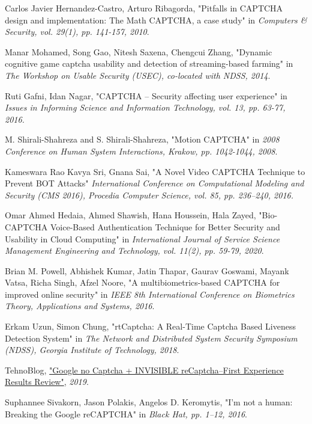 \begin{thebibliography}{9}
Carlos Javier Hernandez-Castro, Arturo Ribagorda, "Pitfalls in CAPTCHA design and implementation: The Math CAPTCHA, a case study" in \emph{Computers \& Security, vol. 29(1), pp. 141-157, 2010}.

Manar Mohamed, Song Gao, Nitesh Saxena, Chengcui Zhang,  "Dynamic cognitive  game  captcha  usability  and  detection  of  streaming-based  farming" in \emph{The Workshop on Usable Security (USEC), co-located with NDSS, 2014}.

Ruti Gafni, Idan Nagar, "CAPTCHA – Security affecting user experience" in \emph{Issues in Informing Science and Information Technology, vol. 13, pp. 63-77, 2016.}

M. Shirali-Shahreza and S. Shirali-Shahreza, "Motion CAPTCHA" in \emph{2008 Conference on Human System Interactions, Krakow, pp. 1042-1044, 2008}.

Kameswara Rao Kavya Sri, Gnana Sai, "A Novel Video CAPTCHA Technique to Prevent BOT Attacks" \emph{International Conference on Computational Modeling and  Security (CMS 2016), Procedia Computer  Science, vol. 85, pp. 236–240, 2016.}

Omar Ahmed Hedaia, Ahmed Shawish, Hana Houssein, Hala Zayed, "Bio-CAPTCHA Voice-Based Authentication Technique for Better Security and Usability in Cloud Computing" in \emph{International Journal of Service Science Management Engineering and Technology, vol. 11(2), pp. 59-79, 2020}.

Brian M. Powell, Abhishek Kumar, Jatin Thapar, Gaurav Goswami, Mayank Vatsa, Richa Singh, Afzel Noore, "A multibiometrics-based CAPTCHA for improved online security" in \emph{IEEE 8th International Conference on Biometrics Theory, Applications and Systems, 2016}.

Erkam Uzun, Simon Chung, "rtCaptcha: A Real-Time Captcha Based Liveness Detection System" in \emph{The Network and Distributed System Security Symposium (NDSS), Georgia Institute of Technology, 2018}.

TehnoBlog, \href{https://tehnoblog.org/google-no-captcha-invisible-recaptcha-first-experience-results-review/}{"Google no Captcha + INVISIBLE reCaptcha–First Experience Results Review"}, \emph{2019}.

Suphannee Sivakorn, Jason Polakis, Angelos D. Keromytis, "I'm not a human: Breaking the Google reCAPTCHA" in \emph{Black Hat, pp. 1–12, 2016}.


\end{thebibliography}
